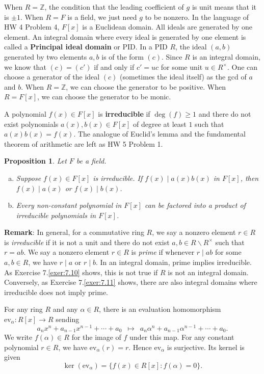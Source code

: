 \documentclass{article}
\def\Z{{\mathbb Z}}
\def\Z{{\mathbb Z}}
\newtheorem{proposition}[subsection]{Proposition}
\begin{document}
When $R = \Z$, the condition that the leading coefficient of $g$ is unit means that it is $\pm1$. When $R = F$ is a field, we just need $g$ to be nonzero. In the language of HW 4 Problem 4, $F[x]$ is a Euclidean domain. All ideals are generated by one element. An integral domain where every ideal is generated by one element is called a \textbf{Principal ideal domain} or PID. In a PID $R$, the ideal $(a,b)$ generated by two elements $a,b$ is of the form $(c)$. Since $R$ is an integral domain, we know that $(c) = (c')$ if and only if $c' = uc$ for some unit $u\in R^\times$. One can choose a generator of the ideal $(c)$ (sometimes the ideal itself) as the gcd of $a$ and $b$. When $R = \Z$, we can choose the generator to be positive. When $R = F[x]$, we can choose the generator to be monic.


A polynomial $f(x)\in F[x]$ is \textbf{irreducible} if $\deg(f)\geq1$ and there do not exist polynomials $a(x),b(x)\in F[x]$ of degree at least $1$ such that $a(x)b(x) = f(x)$. The analogue of Euclid's lemma and the fundamental theorem of arithmetic are left as HW 5 Problem 1.
\begin{proposition}
    Let $F$ be a field.
    \begin{enumerate}[(a)]
        \item Suppose $f(x)\in F[x]$ is irreducible. If $f(x)\mid a(x)b(x)$ in $F[x]$, then $f(x)\mid a(x)$ or $f(x)\mid b(x)$.
        \item Every non-constant polynomial in $F[x]$ can be factored into a product of irreducible polynomials in $F[x]$.
    \end{enumerate}
\end{proposition}

\noindent\textbf{Remark}: In general, for a commutative ring $R$, we say a nonzero element $r\in R$ is \textit{irreducible} if it is not a unit and there do not exist $a,b\in R\backslash R^\times$ such that $r = ab$. We say a nonzero element $r\in R$ is \textit{prime} if whenever $r\mid ab$ for some $a,b\in R$, we have $r\mid a$ or $r\mid b$. In an integral domain, prime implies irreducible. As Exercise 7.\ref{exer:7.10} shows, this is not true if $R$ is not an integral domain. Conversely, as Exercise 7.\ref{exer:7.11} shows, there are also integral domains where irreducible does not imply prime. 

\vspace{5pt}

For any ring $R$ and any $\alpha\in R$, there is an evaluation homomorphism $\text{ev}_\alpha:R[x]\rightarrow R$ sending $$a_nx^n + a_{n-1}x^{n-1} + \cdots + a_0\,\,\, \mapsto \,\,\,a_n\alpha^n + a_{n-1}\alpha^{n-1} + \cdots + a_0.$$
We write $f(\alpha)\in R$ for the image of $f$ under this map. For any constant polynomial $r\in R$, we have $\text{ev}_\alpha(r) = r$. Hence $\text{ev}_\alpha$ is surjective. Its kernel is given
$$\ker(\text{ev}_\alpha) = \{f(x)\in R[x]\colon f(\alpha) = 0\}.$$
\end{document}
